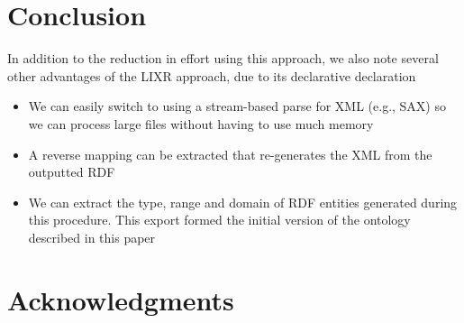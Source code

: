 \documentclass{acm_proc_article-sp}
\begin{document}
\section{Conclusion}
\label{sec:conclusion}

In addition to the reduction in effort using this approach, we also note several
other advantages of the LIXR approach, due to its declarative declaration
\begin{itemize}
\item We can easily switch to using a stream-based parse for XML (e.g., SAX)
so we can process large files without having to use much memory
\item A reverse mapping can be extracted that re-generates the XML from the
outputted RDF
\item We can extract the type, range and domain of RDF entities generated
during this procedure. This export formed the initial version of the
ontology described in this paper
\end{itemize}


\section*{Acknowledgments}



\end{document}
